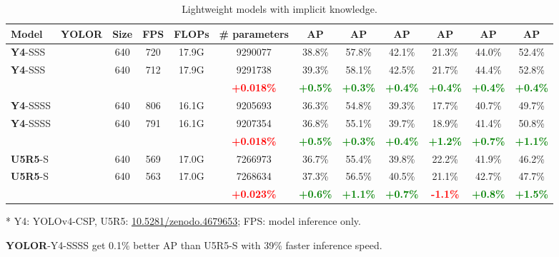 \documentclass[10pt,twocolumn,letterpaper]{article}
\begin{document}
\begin{table*}[t]
	\centering
	\begin{threeparttable}[t]
		\footnotesize
		\caption{Lightweight models with implicit knowledge.}
		\label{table:small}
		\setlength\tabcolsep{4.5pt}
		\begin{tabular}{lccccccccccc}
			\toprule
			\textbf{Model} & \textbf{YOLOR} & \textbf{Size} & \textbf{FPS} & \textbf{FLOPs} & \textbf{\# parameters} & \textbf{AP} & \textbf{AP} & \textbf{AP} & \textbf{AP} & \textbf{AP} & \textbf{AP} \\				
			\midrule
			\textbf{Y4}-SSS &  & 640 & 720 & 17.9G & 9290077 & 38.8\% & 57.8\% & 42.1\% & 21.3\% & 44.0\% & 52.4\% \\
			\textbf{Y4}-SSS &  & 640 & 712 & 17.9G & 9291738 & 39.3\% & 58.1\% & 42.5\% & 21.7\% & 44.4\% & 52.8\% \\
			&  &  &  &  & \textbf{\textcolor{red}{+0.018\%}} & \textbf{\textcolor{green}{+0.5\%}} & \textbf{\textcolor{green}{+0.3\%}} & \textbf{\textcolor{green}{+0.4\%}} & \textbf{\textcolor{green}{+0.4\%}} & \textbf{\textcolor{green}{+0.4\%}} & \textbf{\textcolor{green}{+0.4\%}} \\
			\midrule
			\textbf{Y4}-SSSS &  & 640 & 806 & 16.1G & 9205693 & 36.3\% & 54.8\% & 39.3\% & 17.7\% & 40.7\% & 49.7\% \\
			\textbf{Y4}-SSSS &  & 640 & 791 & 16.1G & 9207354 & 36.8\% & 55.1\% & 39.7\% & 18.9\% & 41.4\% & 50.8\% \\
			&  &  &  &  & \textbf{\textcolor{red}{+0.018\%}} & \textbf{\textcolor{green}{+0.5\%}} & \textbf{\textcolor{green}{+0.3\%}} & \textbf{\textcolor{green}{+0.4\%}} & \textbf{\textcolor{green}{+1.2\%}} & \textbf{\textcolor{green}{+0.7\%}} & \textbf{\textcolor{green}{+1.1\%}} \\
			\midrule
			\textbf{U5R5}-S &  & 640 & 569 & 17.0G & 7266973 & 36.7\% & 55.4\% & 39.8\% & 22.2\% & 41.9\% & 46.2\% \\
			\textbf{U5R5}-S &  & 640 & 563 & 17.0G & 7268634 & 37.3\% & 56.5\% & 40.5\% & 21.1\% & 42.7\% & 47.7\% \\
			&  &  &  &  & \textbf{\textcolor{red}{+0.023\%}} & \textbf{\textcolor{green}{+0.6\%}} & \textbf{\textcolor{green}{+1.1\%}} & \textbf{\textcolor{green}{+0.7\%}} & \textbf{\textcolor{red}{-1.1\%}} & \textbf{\textcolor{green}{+0.8\%}} & \textbf{\textcolor{green}{+1.5\%}} \\				
			\bottomrule
		\end{tabular}
		\begin{tablenotes}[flushleft]
			\footnotesize
			\item[*] Y4: YOLOv4-CSP, U5R5: \url{10.5281/zenodo.4679653}; FPS: model inference only.
			\item[] \textbf{YOLOR}-Y4-SSSS get 0.1\% better AP than U5R5-S with 39\% faster inference speed.
		\end{tablenotes}
	\end{threeparttable}
\end{table*}
\end{document}
